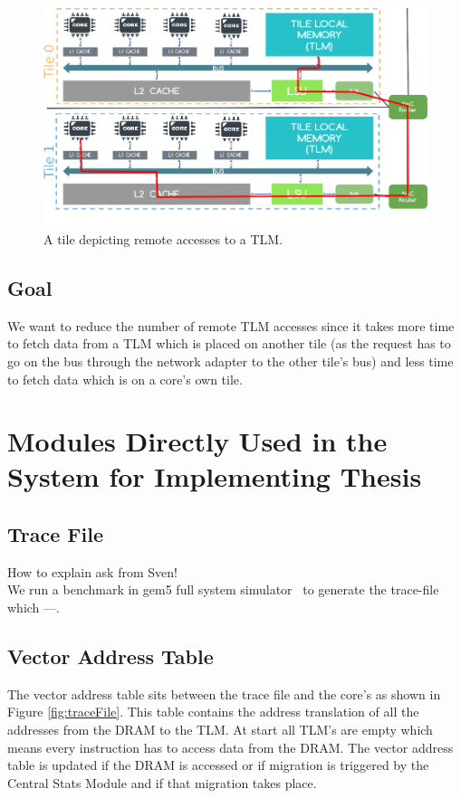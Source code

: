 \documentclass{listhesis}
\begin{document}
\begin{figure}
  \includegraphics[width=\linewidth]{remoteaccesses.png}
  \centering
  \caption{A tile depicting remote accesses to a TLM.}
  \label{fig:remoteaccesses}
\end{figure}
\subsection{Goal}
We want to reduce the number of remote TLM accesses since it takes more time to fetch data from a TLM which is placed on another tile (as the request has to go on the bus through the network adapter to the other tile's bus) and less time to fetch data which is on a core's own tile.  
\section{Modules Directly Used in the System for Implementing Thesis}
\subsection{Trace File}
How to explain ask from Sven! 
\\
We run a benchmark in gem5 full system simulator~\cite{gem5} to generate the trace-file which ---. 
\subsection{Vector Address Table}
The vector address table sits between the trace file and the core's as shown in Figure \ref{fig:traceFile}. This table contains the address translation of all the addresses from the DRAM to the TLM. At start all TLM's are empty which means every instruction has to access data from the DRAM. The vector address table is updated if the DRAM is accessed or if migration is triggered by the Central Stats Module and if that migration takes place.
\end{document}
